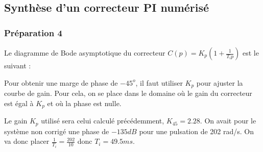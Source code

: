 \documentclass[../../Cours_M1.tex]{subfiles}
\begin{document}
\clearpage
\subsection*{Synthèse d'un correcteur PI numérisé}
\subsubsection*{Préparation 4}

Le diagramme de Bode asymptotique du correcteur $C(p) = K_p(1+\frac{1}{T_ip})$ est le suivant :

\begin{figure}[h!]
\centering
{}
\end{figure}

Pour obtenir une marge de phase de $-45^o$, il faut utiliser $K_p$ pour ajuster la courbe de gain. Pour cela, on se place dans le domaine où le gain du correcteur est égal à $K_p$ et où la phase est nulle. 

Le gain $K_p$ utilisé sera celui calculé précédemment, $K_{45} = 2.28$.
On avait pour le système non corrigé une phase de $-135dB$ pour une pulsation de 202 rad/s. On va donc placer $\frac{1}{T_i}=\frac{202}{10}$ donc $T_i=49.5ms$.
\end{document}
